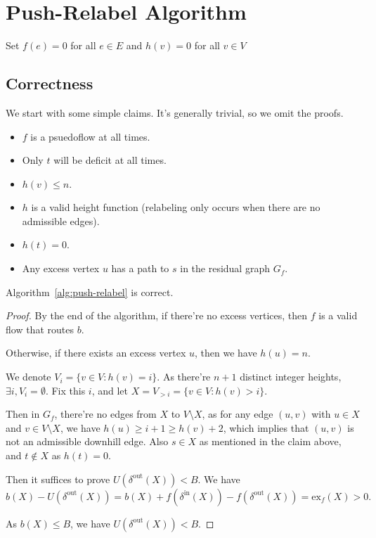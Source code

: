 \section{Push-Relabel Algorithm}

\begin{algorithm}[H]
  \caption{Push-Relabel Algorithm}\label{alg:push-relabel}
  Set $f(e) = 0$ for all $e \in E$ and $h(v) = 0$ for all $v \in V$\;
\end{algorithm}

\subsection{Correctness}

We start with some simple claims. It's generally trivial, so we omit the proofs.

\begin{claim}
  \begin{itemize}
    \item $f$ is a psuedoflow at all times.
    \item Only $t$ will be deficit at all times.
    \item $h(v) \leq n$.
    \item $h$ is a valid height function (relabeling only occurs when there are no admissible edges).
    \item $h(t) = 0$.
    \item Any excess vertex $u$ has a path to $s$ in the residual graph $G_f$.
  \end{itemize}
\end{claim}
\begin{lemma}
  Algorithm~\ref{alg:push-relabel} is correct.
\end{lemma}
\begin{proof}
  By the end of the algorithm, if there're no excess vertices, then $f$ is a valid flow that routes $b$. 

  Otherwise, if there exists an excess vertex $u$, then we have $h(u) = n$. 

  We denote $V_i = \{v \in V: h(v) = i\}$.
  As there're $n+1$ distinct integer heights, $\exists i, V_i = \emptyset$. Fix this $i$, and let $X = V_{>i} = \{v \in V: h(v) > i\}$. 

  Then in $G_f$, there're no edges from $X$ to $V\setminus X$, as for any edge $(u,v)$ with $u \in X$ and $v \in V\setminus X$, we have $h(u) \ge i + 1 \ge h(v) + 2$, which implies that $(u,v)$ is not an admissible downhill edge.
  Also $s\in X$ as mentioned in the claim above, and $t \notin X$ as $h(t) = 0$.

  Then it suffices to prove $U(\delta^{\text{out}}(X)) < B$. We have
  \[b(X) - U(\delta^{\text{out}}(X)) = b(X) + f(\delta^{\text{in}}(X)) - f(\delta^{\text{out}}(X)) = \text{ex}_f(X) > 0.\]

  As $b(X)\le B$, we have $U(\delta^{\text{out}}(X)) < B$.
\end{proof}

